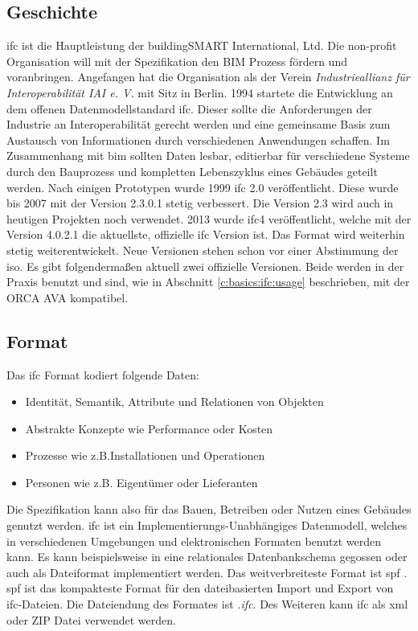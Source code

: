 \subsection{Geschichte}
\label{c:basics:ifc:history}
\ac{ifc} ist die Hauptleistung der buildingSMART International, Ltd.  Die non-profit Organisation will mit der Spezifikation den BIM Prozess fördern und voranbringen. \citep{BuildingSMART_IFC}
Angefangen hat die Organisation als der Verein \textit{Industrieallianz für Interoperabilität IAI e. V.} mit Sitz in Berlin. 1994 startete die Entwicklung an dem offenen Datenmodellstandard \ac{ifc}. Dieser sollte die Anforderungen der Industrie an Interoperabilität gerecht werden und eine gemeinsame Basis zum Austausch von Informationen durch verschiedenen Anwendungen schaffen. Im Zusammenhang mit \ac{bim} sollten Daten lesbar, editierbar für verschiedene Systeme durch den Bauprozess und kompletten Lebenszyklus eines Gebäudes geteilt werden. \citep{Laakso2012-oi} Nach einigen Prototypen wurde 1999 \ac{ifc} 2.0 veröffentlicht. Diese wurde bis 2007 mit der Version 2.3.0.1 stetig verbessert. Die Version 2.3 wird auch in heutigen Projekten noch verwendet. 2013 wurde \ac{ifc}4 veröffentlicht, welche mit der Version 4.0.2.1 die aktuellste, offizielle \ac{ifc} Version ist. Das Format wird weiterhin stetig weiterentwickelt. Neue Versionen stehen schon vor einer Abstimmung der \ac{iso}. \citep{BuildingSMART_history_2022} Es gibt folgendermaßen aktuell zwei offizielle Versionen. Beide werden in der Praxis benutzt und sind, wie in Abschnitt \ref{c:basics:ifc:usage} beschrieben, mit der ORCA AVA kompatibel.


\subsection{Format}
\label{c:basics:ifc:format}
Das \ac{ifc} Format kodiert folgende Daten:
\begin{itemize}
	\item Identität, Semantik, Attribute und Relationen von Objekten
	\item Abstrakte Konzepte wie Performance oder Kosten
	\item Prozesse wie z.B.Installationen und Operationen
	\item Personen wie z.B. Eigentümer oder Lieferanten
\end{itemize}
Die Spezifikation kann also für das Bauen, Betreiben oder Nutzen eines Gebäudes genutzt werden. \ac{ifc} ist ein Implementierungs-Unabhängiges Datenmodell, welches in verschiedenen Umgebungen und elektronischen Formaten benutzt werden kann. Es kann beispielsweise in eine relationales Datenbankschema gegossen oder auch als Dateiformat implementiert werden. Das weitverbreiteste Format ist \ac{spf} \citep{Laakso2012-oi,BuildingSMART_IFC}. \ac{spf} ist das kompakteste Format für den dateibasierten Import und Export von \ac{ifc}-Dateien. Die Dateiendung des Formates ist \glqq \textit{.ifc}\grqq{}. Des Weiteren kann \ac{ifc} als \ac{xml} oder ZIP Datei verwendet werden. \citep{BuildingSMART_IFC}

